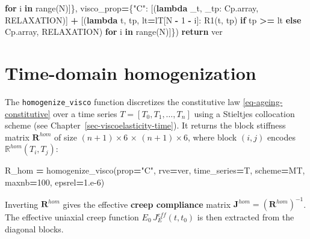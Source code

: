 \documentclass[
  a4paper,
  numbers=noendperiod,
  DIV=12]{scrreprt}
\newenvironment{Shaded}{\begin{snugshade}}{\end{snugshade}}
\newcommand{\BuiltInTok}[1]{#1}
\newcommand{\ControlFlowTok}[1]{\textcolor[rgb]{0.13,0.29,0.53}{\textbf{#1}}}
\newcommand{\DecValTok}[1]{\textcolor[rgb]{0.00,0.00,0.81}{#1}}
\newcommand{\FloatTok}[1]{\textcolor[rgb]{0.00,0.00,0.81}{#1}}
\newcommand{\KeywordTok}[1]{\textcolor[rgb]{0.13,0.29,0.53}{\textbf{#1}}}
\newcommand{\NormalTok}[1]{#1}
\newcommand{\OperatorTok}[1]{\textcolor[rgb]{0.81,0.36,0.00}{\textbf{#1}}}
\newcommand{\StringTok}[1]{\textcolor[rgb]{0.31,0.60,0.02}{#1}}
\begin{document}
\begin{Shaded}
\begin{Highlighting}[]
                                   \ControlFlowTok{for}\NormalTok{ i }\KeywordTok{in} \BuiltInTok{range}\NormalTok{(N)]\},}
\NormalTok{                visco\_prop}\OperatorTok{=}\NormalTok{\{}\StringTok{"C"}\NormalTok{:}
\NormalTok{                    [(}\KeywordTok{lambda}\NormalTok{ \_t, \_tp: Cp.array, RELAXATION)] }\OperatorTok{+}
\NormalTok{                    [(}\KeywordTok{lambda}\NormalTok{ t, tp, lt}\OperatorTok{=}\NormalTok{lT[N }\OperatorTok{{-}} \DecValTok{1} \OperatorTok{{-}}\NormalTok{ i]: R1(t, tp) }\ControlFlowTok{if}\NormalTok{ tp }\OperatorTok{\textgreater{}=}\NormalTok{ lt }\ControlFlowTok{else}\NormalTok{ Cp.array,}
\NormalTok{                      RELAXATION)}
                     \ControlFlowTok{for}\NormalTok{ i }\KeywordTok{in} \BuiltInTok{range}\NormalTok{(N)]\})}
    \ControlFlowTok{return}\NormalTok{ ver}
\end{Highlighting}
\end{Shaded}

\section{Time-domain homogenization}\label{sec-visco-homo}

The \texttt{homogenize\_visco} function discretizes the constitutive law
\ref{eq-ageing-constitutive} over a time series
\(T = [T_0, T_1, \ldots, T_n]\) using a Stieltjes collocation scheme
(see Chapter~\ref{sec-viscoelasticity-time}). It returns the block
stiffness matrix \(\mathbf{R}^{hom}\) of size
\((n+1)\times 6 \,\times\, (n+1)\times 6\), where block \((i,j)\)
encodes \(\mathbb{R}^{hom}(T_i, T_j)\):

\begin{Shaded}
\begin{Highlighting}[]
\NormalTok{R\_hom }\OperatorTok{=}\NormalTok{ homogenize\_visco(prop}\OperatorTok{=}\StringTok{"C"}\NormalTok{, rve}\OperatorTok{=}\NormalTok{ver, time\_series}\OperatorTok{=}\NormalTok{T,}
\NormalTok{                          scheme}\OperatorTok{=}\NormalTok{MT, maxnb}\OperatorTok{=}\DecValTok{100}\NormalTok{, epsrel}\OperatorTok{=}\FloatTok{1.e{-}6}\NormalTok{)}
\end{Highlighting}
\end{Shaded}

Inverting \(\mathbf{R}^{hom}\) gives the effective \textbf{creep
compliance} matrix \(\mathbf{J}^{hom} = (\mathbf{R}^{hom})^{-1}\). The
effective uniaxial creep function \(E_0\,J^{eff}_E(t,t_0)\) is then
extracted from the diagonal blocks.
\end{document}
